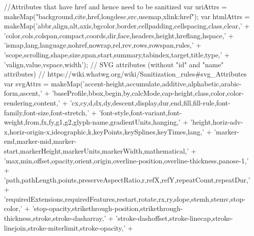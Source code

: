 \begin{DoxyCodeInclude}
\textcolor{stringliteral}{//Attributes that have href and hence need to be sanitized}
\textcolor{stringliteral}{var uriAttrs = makeMap("background,cite,href,longdesc,src,usemap,xlink:href");}
\textcolor{stringliteral}{}
\textcolor{stringliteral}{var htmlAttrs = makeMap('}abbr,align,alt,axis,bgcolor,border,cellpadding,cellspacing,\textcolor{keyword}{class},clear,\textcolor{stringliteral}{' +}
\textcolor{stringliteral}{    '}color,cols,colspan,compact,coords,dir,face,headers,height,hreflang,hspace,\textcolor{stringliteral}{' +}
\textcolor{stringliteral}{    '}ismap,lang,language,nohref,nowrap,rel,rev,rows,rowspan,rules,\textcolor{stringliteral}{' +}
\textcolor{stringliteral}{    '}scope,scrolling,shape,size,span,start,summary,tabindex,target,title,type,\textcolor{stringliteral}{' +}
\textcolor{stringliteral}{    '}valign,value,vspace,width\textcolor{stringliteral}{');}
\textcolor{stringliteral}{}
\textcolor{stringliteral}{// SVG attributes (without "id" and "name" attributes)}
\textcolor{stringliteral}{// https://wiki.whatwg.org/wiki/Sanitization\_rules#svg\_Attributes}
\textcolor{stringliteral}{var svgAttrs = makeMap('}accent-height,accumulate,additive,alphabetic,arabic-form,ascent,\textcolor{stringliteral}{' +}
\textcolor{stringliteral}{    '}baseProfile,bbox,begin,by,calcMode,cap-height,\textcolor{keyword}{class},color,color-rendering,content,\textcolor{stringliteral}{' +}
\textcolor{stringliteral}{    '}cx,cy,d,dx,dy,descent,display,dur,end,fill,fill-rule,font-family,font-size,font-stretch,\textcolor{stringliteral}{' +}
\textcolor{stringliteral}{    '}font-style,font-variant,font-weight,from,fx,fy,g1,g2,glyph-name,gradientUnits,hanging,\textcolor{stringliteral}{' +}
\textcolor{stringliteral}{    '}height,horiz-adv-x,horiz-origin-x,ideographic,k,keyPoints,keySplines,keyTimes,lang,\textcolor{stringliteral}{' +}
\textcolor{stringliteral}{    '}marker-end,marker-mid,marker-start,markerHeight,markerUnits,markerWidth,mathematical,\textcolor{stringliteral}{' +}
\textcolor{stringliteral}{    '}max,min,offset,opacity,orient,origin,overline-position,overline-thickness,panose-1,\textcolor{stringliteral}{' +}
\textcolor{stringliteral}{    '}path,pathLength,points,preserveAspectRatio,r,refX,refY,repeatCount,repeatDur,\textcolor{stringliteral}{' +}
\textcolor{stringliteral}{    '}requiredExtensions,requiredFeatures,restart,rotate,rx,ry,slope,stemh,stemv,stop-color,\textcolor{stringliteral}{' +}
\textcolor{stringliteral}{    '}stop-opacity,strikethrough-position,strikethrough-thickness,stroke,stroke-dasharray,\textcolor{stringliteral}{' +}
\textcolor{stringliteral}{    '}stroke-dashoffset,stroke-linecap,stroke-linejoin,stroke-miterlimit,stroke-opacity,\textcolor{stringliteral}{' +}

\end{DoxyCodeInclude}
